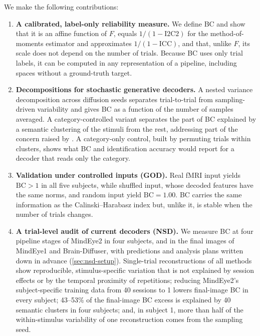 \documentclass[11pt,a4paper]{article}
\begin{document}
We make the following contributions:

\begin{enumerate}[leftmargin=1.5em]
  \item \textbf{A calibrated, label-only reliability measure.} We define BC and
    show that it is an affine function of $F$, equals $1/(1-\mathrm{I2C2})$ for
    the method-of-moments estimator and approximates $1/(1-\mathrm{ICC})$, and
    that, unlike $F$, its scale does not depend on the number of trials.
    Because BC uses only trial labels, it can be computed in any representation
    of a pipeline, including spaces without a ground-truth target.

  \item \textbf{Decompositions for stochastic generative decoders.} A nested
    variance decomposition across diffusion seeds separates trial-to-trial from
    sampling-driven variability and gives BC as a function of the number of
    samples averaged. A category-controlled variant separates the part of BC
    explained by a semantic clustering of the stimuli from the rest, addressing
    part of the concern raised by \citet{shirakawa2025}. A category-only control,
    built by permuting trials within clusters, shows what BC and identification
    accuracy would report for a decoder that reads only the category.

  \item \textbf{Validation under controlled inputs (GOD).} Real fMRI input
    yields $\mathrm{BC}>1$ in all five subjects, while shuffled input, whose
    decoded features have the same norms, and random input yield
    $\mathrm{BC}=1.00$. BC carries the same
    information as the Calinski--Harabasz index but, unlike it, is stable when
    the number of trials changes.

  \item \textbf{A trial-level audit of current decoders (NSD).} We measure BC at
    four pipeline stages of MindEye2 in four subjects, and in the final images of
    MindEye1 and Brain-Diffuser, with predictions and analysis plans written
    down in advance (\cref{sec:nsd-setup}). Single-trial reconstructions of all
    methods show reproducible, stimulus-specific variation that is not explained
    by session effects or by the temporal proximity of repetitions; reducing
    MindEye2's subject-specific training data from 40 sessions to 1 lowers
    final-image BC in every subject; 43--53\% of the final-image BC excess is
    explained by 40 semantic clusters in four subjects; and, in subject 1, more
    than half of the within-stimulus variability of one reconstruction comes
    from the sampling seed.


\end{enumerate}
\end{document}
